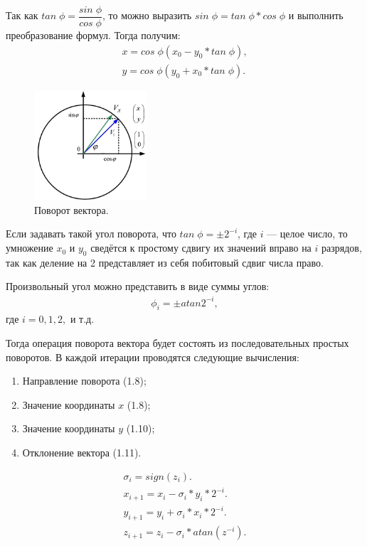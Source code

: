 	Так как $tan\;\phi=\dfrac{sin\;\phi}{cos\;\phi}$, то можно выразить $sin\;\phi=tan\;\phi*cos\;\phi$ и выполнить преобразование формул. Тогда получим:
	\begin{gather}
	x=cos\;\phi(x_{0}-y_{0}*tan\;\phi), \\
	y=cos\;\phi(y_{0}+x_{0}*tan\;\phi). 
	\end{gather}
	
	\begin{figure}[H]
    \centering
    \includegraphics[width=0.375\textwidth]{../image/cordic2.png}
    \caption{Поворот вектора.}
	\end{figure}

	Если задавать такой угол поворота, что $tan\;\phi = \pm 2^{-i}$, где $i$ --- целое число, то умножение $x_{0}$ и $y_{0}$ сведётся к простому сдвигу их значений вправо на $i$ разрядов, так как деление на 2 представляет из себя побитовый сдвиг числа право.

	Произвольный угол можно представить в виде суммы углов:
	\begin{gather}
	\phi_{i}=\pm atan2^{-i}, 
	\end{gather}	
	где $i = 0, 1, 2,$ и т.д.

	Тогда операция поворота вектора будет состоять из последовательных простых поворотов. В каждой итерации проводятся следующие вычисления:
	\begin{enumerate}
	\item Направление поворота (1.8);
	\item Значение координаты $x$ (1.8);
	\item Значение координаты $y$ (1.10);
	\item Отклонение вектора	(1.11).
	\end{enumerate}
	\begin{gather}
	\sigma_{i} 	= sign(z_{i}). \\
	x_{i+1} = x_{i} - \sigma_{i}*y_{i}*2^{-i}. \\
	y_{i+1} = y_{i} + \sigma_{i}*x_{i}*2^{-i}. \\
	z_{i+1} = z_{i} - \sigma_{i}*atan(z^{-i}). 
	\end{gather}
	
